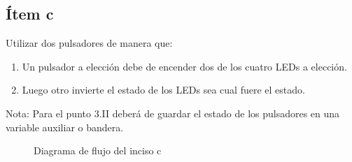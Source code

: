\documentclass[12pt,a4paper]{article}
\begin{document}

\subsection*{Ítem c} Utilizar dos pulsadores de manera que:

\renewcommand{\labelenumi}{\Roman{enumi}.} %
\begin{enumerate}
	\item Un pulsador a elección debe de encender dos de los cuatro LEDs a elección.
	\item  Luego otro invierte el estado de los LEDs sea cual fuere el estado.
\end{enumerate}

Nota: Para el punto 3.II deberá de guardar el estado de los pulsadores en una variable auxiliar
o bandera.


\begin{figure} [H] %
	\centering
	\caption{Diagrama de flujo del inciso c}
	\label{fig:inciso_c}
\end{figure}


\end{document}
